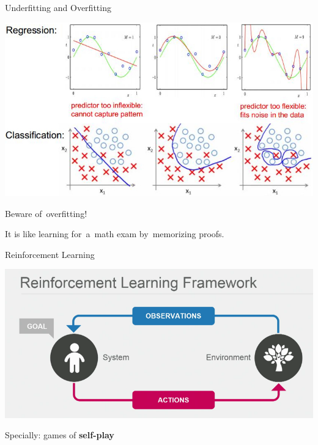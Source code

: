 \documentclass{beamer}
\begin{document}
  {
    \begin{frame}{Underfitting and Overfitting}
      \begin{center}
        \includegraphics[width=.75\textwidth]{../img/underfitting_and_overfitting.jpg}
        \pause
      \end{center}

      Beware of~overfitting!
      \pause

      It is like learning for~a~math exam by~memorizing proofs.
    \end{frame}
  }

  {
    \begin{frame}{Reinforcement Learning}
      \begin{center}
        \includegraphics[width=\textwidth]{../img/RL_framework.png}
      \end{center}
      \pause
      
      Specially: games of \textbf{self-play}
    \end{frame}
  }

\end{document}

